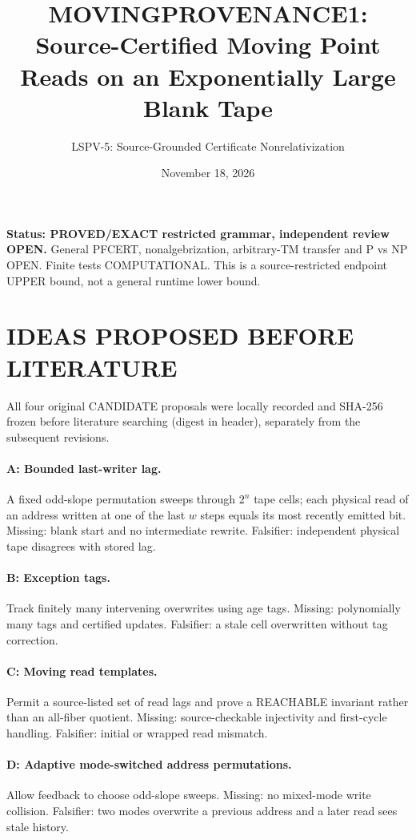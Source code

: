 \documentclass[11pt]{article}
\title{MOVINGPROVENANCE1: Source-Certified Moving Point Reads on an Exponentially Large Blank Tape}
\author{LSPV-5: Source-Grounded Certificate Nonrelativization}
\date{November 18, 2026}
\begin{document}
\maketitle
\noindent\textbf{Status: PROVED/EXACT restricted grammar, independent review OPEN.} General PFCERT, nonalgebrization, arbitrary-TM transfer and P vs NP OPEN. Finite tests COMPUTATIONAL. This is a source-restricted endpoint UPPER bound, not a general runtime lower bound.

\section{IDEAS PROPOSED BEFORE LITERATURE}
All four original CANDIDATE proposals were locally recorded and SHA-256 frozen before literature searching (digest in header), separately from the subsequent revisions.
\paragraph{A: Bounded last-writer lag.} A fixed odd-slope permutation sweeps through $2^n$ tape cells; each physical read of an address written at one of the last $w$ steps equals its most recently emitted bit. Missing: blank start and no intermediate rewrite. Falsifier: independent physical tape disagrees with stored lag.
\paragraph{B: Exception tags.} Track finitely many intervening overwrites using age tags. Missing: polynomially many tags and certified updates. Falsifier: a stale cell overwritten without tag correction.
\paragraph{C: Moving read templates.} Permit a source-listed set of read lags and prove a REACHABLE invariant rather than an all-fiber quotient. Missing: source-checkable injectivity and first-cycle handling. Falsifier: initial or wrapped read mismatch.
\paragraph{D: Adaptive mode-switched address permutations.} Allow feedback to choose odd-slope sweeps. Missing: no mixed-mode write collision. Falsifier: two modes overwrite a previous address and a later read sees stale history.
\end{document}
